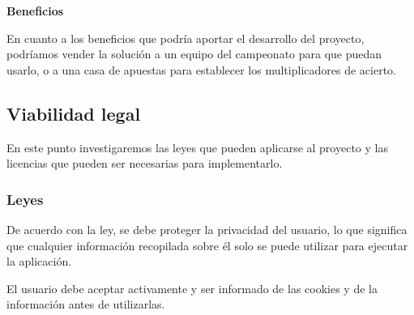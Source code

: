 \textbf{Beneficios}

En cuanto a los beneficios que podría aportar el desarrollo del proyecto, podríamos vender la solución a un equipo del campeonato para que puedan usarlo, o a una casa de apuestas para establecer los multiplicadores de acierto.

\subsection{Viabilidad legal}

En este punto investigaremos las leyes que pueden aplicarse al proyecto y las licencias que pueden ser necesarias para implementarlo.

\subsubsection{Leyes}

De acuerdo con la ley, se debe proteger la privacidad del usuario, lo que significa que cualquier información recopilada sobre él solo se puede utilizar para ejecutar la aplicación.

El usuario debe aceptar activamente y ser informado de las cookies y de la información antes de utilizarlas.

